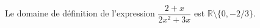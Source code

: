Le domaine de définition de l'expression $\dfrac{2+x}{2x^2+3x}$ est $\mathbb R \setminus \{0,-2/3\}$.

\begin{reponses}
\end{reponses}

